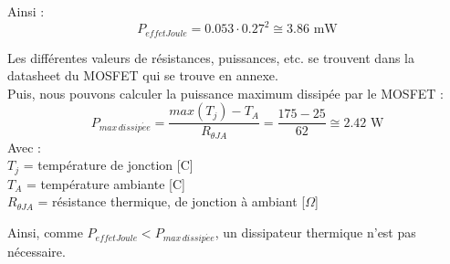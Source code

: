 Ainsi :
\begin{equation}
    P_{effetJoule} = 0.053\cdot 0.27^2 \cong 3.86 \text{ mW}
\end{equation}

Les différentes valeurs de résistances, puissances, etc. se trouvent dans la datasheet du MOSFET qui se trouve en annexe. \\

Puis, nous pouvons calculer la puissance maximum dissipée par le MOSFET :
\[P_{max\,dissip\acute{e}e} = \frac{max(T_j) - T_A}{R_{\theta JA}} = \frac{175-25}{62}\cong 2.42 \text{ W}\]
Avec :\\
$T_j$ = température de jonction [\textdegree C]\\
$T_A$ = température ambiante [\textdegree C]\\
$R_{\theta JA}$ = résistance thermique, de jonction à ambiant [$\Omega$]

Ainsi, comme $P_{effetJoule} < P_{max\,dissip\acute{e}e}$, un dissipateur thermique n'est pas nécessaire. \\


